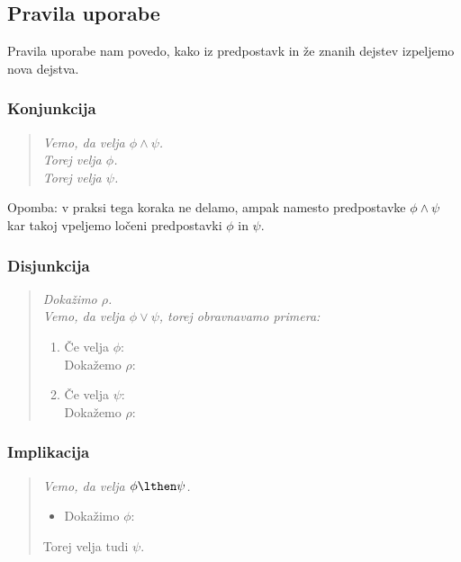 \subsection{Pravila uporabe}

Pravila uporabe nam povedo, kako iz predpostavk in že znanih dejstev izpeljemo nova dejstva.

\subsubsection{Konjunkcija} 

\begin{quote}
  \sl
  Vemo, da velja $\phi \land \psi$.\\
  Torej velja $\phi$.\\
  Torej velja $\psi$.
\end{quote}
%
Opomba: v praksi tega koraka ne delamo, ampak namesto predpostavke $\phi \land \psi$ kar takoj vpeljemo ločeni
predpostavki $\phi$ in $\psi$.


\subsubsection{Disjunkcija}
%
\begin{quote}
  \sl
  Dokažimo $\rho$.\\
  Vemo, da velja $\phi \lor \psi$, torej obravnavamo primera:\\
  \begin{enumerate}
  \item Če velja $\phi$: \\
        Dokažemo $\rho$: \quad {}
  \item Če velja $\psi$: \\
        Dokažemo $\rho$: \quad {}
  \end{enumerate}
\end{quote}

\subsubsection{Implikacija}

\begin{quote}
  \sl
  Vemo, da velja $\phi \lthen \psi$.
  \begin{itemize}
  \item[] Dokažimo $\phi$: \quad {}
  \end{itemize}
  Torej velja tudi $\psi$.
\end{quote}

